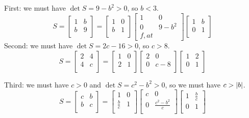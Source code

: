 \documentclass[a4paper]{article}
\begin{document}
First: we must have \(\det S = 9 - b^{2} > 0\), so \(b < 3\).
\[
	S = 
	\begin{bmatrix}
		1 & b \\
		b & 9 \\
	\end{bmatrix}
	=
	\begin{bmatrix}
		1 & 0 \\
		b & 1 \\
	\end{bmatrix}
	\begin{bmatrix}
		1 & 0 \\
		0 & 9 - b^{2} \\
	f,at\end{bmatrix}
	\begin{bmatrix}
		1 & b \\
		0 & 1 \\
	\end{bmatrix}
\]
Second: we must have \(\det S = 2c - 16 > 0\), so \(c > 8\).
\[
	S = 
	\begin{bmatrix}
		2 & 4 \\
		4 & c \\
	\end{bmatrix}
	=
	\begin{bmatrix}
		1 & 0 \\
		2 & 1 \\
	\end{bmatrix}
	\begin{bmatrix}
		2 & 0 \\
		0 & c - 8 \\
	\end{bmatrix}
	\begin{bmatrix}
		1 & 2 \\
		0 & 1 \\
	\end{bmatrix}
\]

Third: we must have \(c > 0\) and \(\det S = c^{2} - b^{2} > 0\), so we must have \(c > \abs{b}\).
\[
	S =
	\begin{bmatrix}
		c & b \\
		b & c \\
	\end{bmatrix}
	=
	\begin{bmatrix}
		1 & 0 \\
		\displaystyle{\frac{b}{c}} & 1 \\
	\end{bmatrix}
	\begin{bmatrix}
		c & 0 \\
		0 & \displaystyle{\frac{c^{2} - b^{2}}{c}} \\
	\end{bmatrix}
	\begin{bmatrix}
		1 & \displaystyle{\frac{b}{c}} \\
		0 & 1 \\
	\end{bmatrix}
\]
\end{document}
